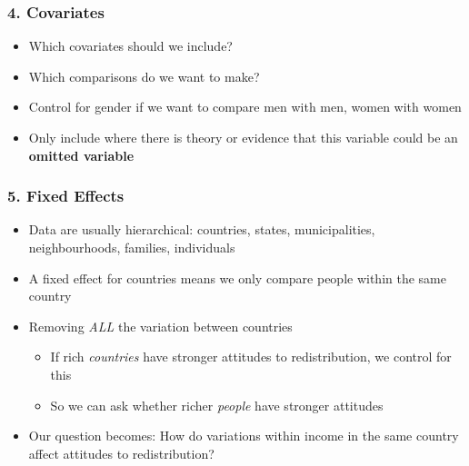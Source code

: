 \documentclass[xcolor=x11names,compress]{beamer}\usepackage[]{graphicx}\usepackage[]{color}
\renewcommand{\(}{\begin{columns}}
\renewcommand{\)}{\end{columns}}
\newcommand{\<}[1]{\begin{column}{#1}}
\renewcommand{\>}{\end{column}}
\begin{document}
\begin{frame}
\frametitle{4. Covariates}
\begin{itemize}
\item Which covariates should we include?
\pause
\item Which comparisons do we want to make?
\pause
\item Control for gender if we want to compare men with men, women with women
\pause
\item Only include where there is theory or evidence that this variable could be an \textbf{omitted variable}
\end{itemize}
\end{frame}

\begin{frame}
\frametitle{5. Fixed Effects}
\begin{itemize}
\item Data are usually hierarchical: countries, states, municipalities, neighbourhoods, families, individuals
\pause
\item A fixed effect for countries means we only compare people within the same country
\pause
\item Removing \textit{ALL} the variation between countries
\begin{itemize}
\item If rich \textit{countries} have stronger attitudes to redistribution, we control for this
\item So we can ask whether richer \textit{people} have stronger attitudes
\end{itemize}
\pause
\item Our question becomes: How do variations within income in the same country affect attitudes to redistribution?
\end{itemize}
\end{frame}
\end{document}
